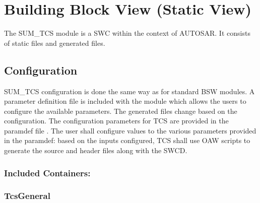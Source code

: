\chapter{Building Block View (Static View)}

The SUM_TCS module is a SWC within the context of AUTOSAR.
It consists of static files and generated files.

\section{Configuration}

SUM_TCS configuration is done the same way as for standard BSW modules.
A parameter definition file is included with the module which allows the users to configure the available parameters.
The generated files change based on the configuration.
The configuration parameters for TCS are provided in the paramdef file .
The user shall configure values to the various parameters provided in the paramdef: based on the inputs configured, TCS shall use OAW scripts to generate the source and header files along with the SWCD.

\subsection{Included Containers:}



\subsection{TcsGeneral}
\label{sec:TcsGeneral}




